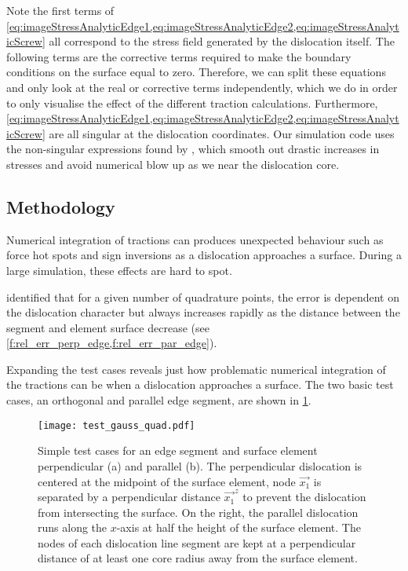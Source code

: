 Note the first terms of \cref{eq:imageStressAnalyticEdge1,eq:imageStressAnalyticEdge2,eq:imageStressAnalyticScrew} all correspond to the stress field generated by the dislocation itself. The following terms are the corrective terms required to make the boundary conditions on the surface equal to zero. Therefore, we can split these equations and only look at the real or corrective terms independently, which we do in order to only visualise the effect of the different traction calculations. Furthermore, \cref{eq:imageStressAnalyticEdge1,eq:imageStressAnalyticEdge2,eq:imageStressAnalyticScrew} are all singular at the dislocation coordinates. Our simulation code uses the non-singular expressions found by \citet{a_non-singular_continuum_theory_of_dislocations}, which smooth out drastic increases in stresses and avoid numerical blow up as we near the dislocation core.

\subsection{Methodology}\label{ss:paperMethod}

Numerical integration of tractions can produces unexpected behaviour such as force hot spots and sign inversions as a dislocation approaches a surface. During a large simulation, these effects are hard to spot.

\citet{analytic_tractions} identified that for a given number of quadrature points, the error is dependent on the dislocation character but always increases rapidly as the distance between the segment and element surface decrease (see \cref{f:rel_err_perp_edge,f:rel_err_par_edge}).

Expanding the test cases reveals just how problematic numerical integration of the tractions can be when a dislocation approaches a surface. The two basic test cases, an orthogonal and parallel edge segment, are shown in \cref{f:gauss_quad_test}.
\begin{figure}
  \centering
  \texttt{[image: test\_gauss\_quad.pdf]}
  \caption[Test cases for comparing numeric v.s. analytic tractions using an edge dislocation near a surface.]{Simple test cases for an edge segment and surface element perpendicular (a) and parallel (b). The perpendicular dislocation is centered at the midpoint of the surface element, node $\vec{x_1}$ is separated by a perpendicular distance $\vec{x_1}^z$ to prevent the dislocation from intersecting the surface. On the right, the parallel dislocation runs along the $x$-axis at half the height of the surface element. The nodes of each dislocation line segment are kept at a perpendicular distance of at least one core radius away from the surface element.}
  \label{f:gauss_quad_test}
\end{figure}

